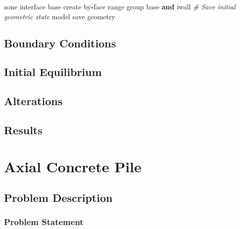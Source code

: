 \documentclass[a4paper, nobind]{templates/ociamthesis}
\newenvironment{Shaded}{\begin{snugshade}}{\end{snugshade}}
\newcommand{\BuiltInTok}[1]{#1}
\newcommand{\CommentTok}[1]{\textcolor[rgb]{0.56,0.35,0.01}{\textit{#1}}}
\newcommand{\KeywordTok}[1]{\textcolor[rgb]{0.13,0.29,0.53}{\textbf{#1}}}
\newcommand{\NormalTok}[1]{#1}
\newcommand{\OperatorTok}[1]{\textcolor[rgb]{0.81,0.36,0.00}{\textbf{#1}}}
\newcommand{\StringTok}[1]{\textcolor[rgb]{0.31,0.60,0.02}{#1}}
\renewenvironment{Shaded}
{
  \vspace{10pt}%
  \begin{snugshade}%
}{%
  \end{snugshade}%
  \vspace{8pt}%
}
\begin{document}
\begin{Shaded}
\begin{Highlighting}[]
\NormalTok{zone interface }\StringTok{\textquotesingle{}base\textquotesingle{}}\NormalTok{ create by}\OperatorTok{{-}}\NormalTok{face }\BuiltInTok{range}\NormalTok{ group }\StringTok{\textquotesingle{}base\textquotesingle{}} \KeywordTok{and} \StringTok{\textquotesingle{}iwall\textquotesingle{}}
\CommentTok{\# Save initial geometric state}
\NormalTok{model save }\StringTok{\textquotesingle{}geometry\textquotesingle{}}
\end{Highlighting}
\end{Shaded}

\hypertarget{boundary-conditions}{%
\section{Boundary Conditions}\label{boundary-conditions}}

\hypertarget{initial-equilibrium}{%
\section{Initial Equilibrium}\label{initial-equilibrium}}

\hypertarget{alterations}{%
\section{Alterations}\label{alterations}}

\hypertarget{results}{%
\section{Results}\label{results}}

\newpage

\hypertarget{axial-concrete-pile}{%
\chapter{Axial Concrete Pile}\label{axial-concrete-pile}}

\hypertarget{problem-description}{%
\section{Problem Description}\label{problem-description}}

\hypertarget{problem-statement}{%
\subsection{Problem Statement}\label{problem-statement}}
\end{document}
